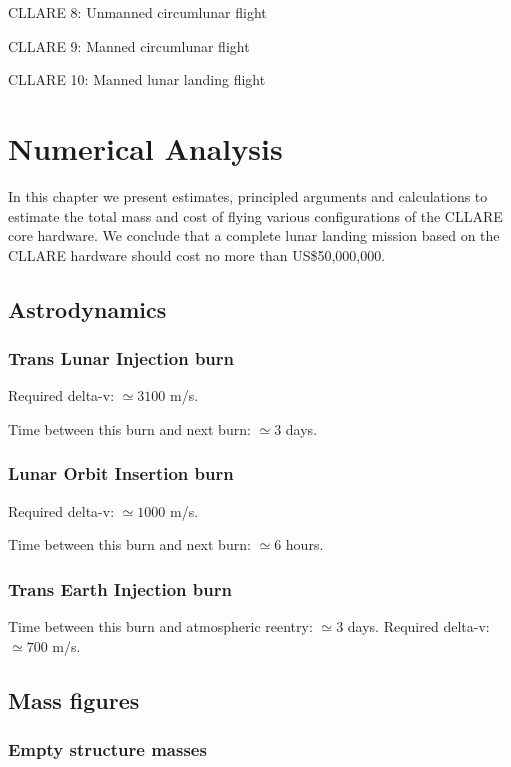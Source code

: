 \documentclass{report}
\begin{document}
CLLARE 8: Unmanned circumlunar flight

CLLARE 9: Manned circumlunar flight

CLLARE 10: Manned lunar landing flight


\chapter{Numerical Analysis} \label{chap:numeric}

In this chapter we present estimates, principled arguments and calculations to estimate the total mass and cost of flying various configurations of the CLLARE core hardware.  We conclude that a complete lunar landing mission based on the CLLARE hardware should cost no more than US\$50,000,000.

\section{Astrodynamics}

\subsection{Trans Lunar Injection burn}

Required delta-v: $\simeq 3100$ m/s.

Time between this burn and next burn: $\simeq 3$ days.

\subsection{Lunar Orbit Insertion burn}

Required delta-v: $\simeq 1000$ m/s.

Time between this burn and next burn: $\simeq 6$ hours.

\subsection{Trans Earth Injection burn}

Time between this burn and atmospheric reentry: $\simeq 3$ days.
Required delta-v: $\simeq 700$ m/s.

\section{Mass figures}

\subsection{Empty structure masses}
\end{document}
